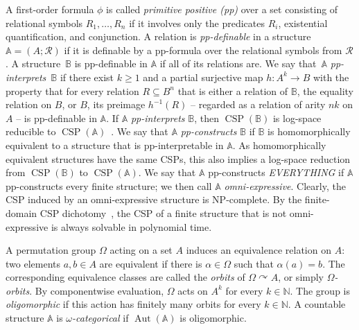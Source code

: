\documentclass[a4paper,reqno, cleveref]{amsart}
\newcommand{\N}{\mathbb{N}}
\newcommand{\acts}{\curvearrowright}
\DeclareMathOperator{\CSP}{CSP}
\DeclareMathOperator{\Aut}{Aut}
\newcommand{\sA}{\mathbb A}
\newcommand{\sB}{\mathbb B}
\begin{document}
A first-order formula $\phi$ is called \emph{primitive positive (pp)} over a  set consisting of
relational  symbols $R_1, \dots, R_n$ 
 if it involves only the predicates $R_i$,  existential quantification, and conjunction. 
A relation is \emph{pp-definable} in a structure $\sA=(A; \mathcal{ R})$ if it is definable by a pp-formula over  
the relational symbols from $\mathcal R$. 
A structure~$\sB$ is pp-definable in $\sA$ if all of its relations are. We say that~$\sA$  \emph{pp-interprets}~$\sB$ if there exist $k \geq 1$ and a partial surjective map $h: A^k \to B$ with the property that for every relation $R \subseteq B^n$ that  is either a relation of $\sB$, the equality relation on
$B$, or $B$, its  preimage $h^{-1}(R)$ -- regarded as a relation of arity $nk$ on $A$ -- is pp-definable in $\sA$.
%
If $\sA$  \emph{pp-interprets} $\sB$, then $\CSP(\sB)$ is log-space reducible to $\CSP(\sA)$~\cite{JBK}. 
%
We say that $\sA$ \emph{pp-constructs} $\sB$ if $\sB$ is homomorphically equivalent to a structure that is pp-interpretable in $\sA$.
%
As homomorphically equivalent structures have the same CSPs, this also implies a log-space  reduction from $\CSP(\sB)$ to $\CSP(\sA)$. 
%
We say that $\sA$ pp-constructs \emph{EVERYTHING} if $\sA$ pp-constructs every finite structure; we then call $\sA$ \emph{omni-expressive}. 
%
Clearly, the CSP induced by an omni-expressive structure is NP-complete. By the finite-domain CSP dichotomy~\cite{BulatovFVConjecture,ZhukFVConjecture,Zhuk20}, the CSP of a finite structure that is not omni-expressive is always solvable in polynomial time.

A permutation group $\Omega$ acting on a set $A$ induces an equivalence relation on $A$: two elements $a,b \in A$ are equivalent if there is $\alpha \in \Omega$ such that $\alpha(a)=b$. The corresponding equivalence classes are called the \emph{orbits} of $\Omega \acts A$, or simply \emph{$\Omega$-orbits}. By componentwise evaluation, $\Omega$ acts on $A^k$ for every $k\in \N.$  The group is \emph{oligomorphic} if this  action has finitely many orbits for every $k \in \N$.   A countable structure $\sA$ is \emph{$\omega$-categorical} if $\Aut(\sA)$ is oligomorphic.
\end{document}
